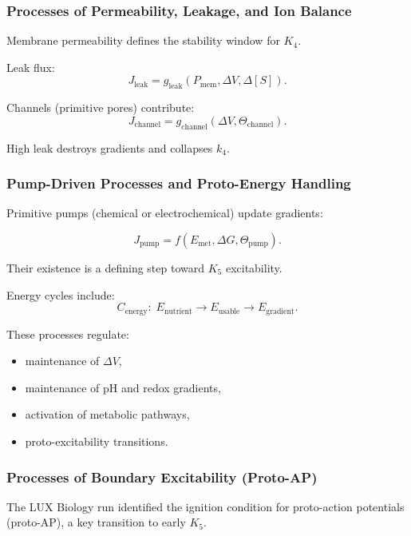 \subsubsection{Processes of Permeability, Leakage, and Ion Balance}

Membrane permeability defines the stability window for $K_4$.

Leak flux:
\[
J_{\text{leak}} = g_\text{leak}(P_\text{mem}, \Delta V, \Delta[S]).
\]

Channels (primitive pores) contribute:
\[
J_{\text{channel}} = g_{\text{channel}}(\Delta V, \Theta_{\text{channel}}).
\]

High leak destroys gradients and collapses $k_4$.

\subsubsection{Pump-Driven Processes and Proto-Energy Handling}

Primitive pumps (chemical or electrochemical) update gradients:

\[
J_{\text{pump}} = f(E_{\text{met}}, \Delta G, \Theta_{\text{pump}}).
\]

Their existence is a defining step toward $K_5$ excitability.

Energy cycles include:
\[
C_\text{energy}: \; 
E_\text{nutrient} \to E_\text{usable} \to E_\text{gradient}.
\]

These processes regulate:
\begin{itemize}
    \item maintenance of $\Delta V$,
    \item maintenance of pH and redox gradients,
    \item activation of metabolic pathways,
    \item proto-excitability transitions.
\end{itemize}

\subsubsection{Processes of Boundary Excitability (Proto-AP)}

The LUX Biology run identified the ignition condition for proto-action 
potentials (proto-AP), a key transition to early $K_5$.

